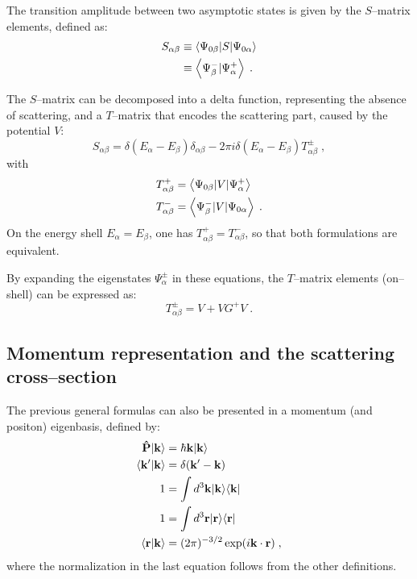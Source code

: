 The transition amplitude between two asymptotic states is given by the $S$--matrix elements, defined as:
\begin{align}
  S_{\alpha\beta} &\equiv \left\langle \Psi_{0\beta} \vert S \vert \Psi_{0\alpha} \right\rangle \nonumber\\
  & \equiv \left\langle \Psi_\beta^- \vert \Psi_\alpha^+ \right\rangle \; .
  \label{<++>}
\end{align}

The $S$--matrix can be decomposed into a delta function, representing the absence of scattering, and a $T$--matrix that encodes the scattering part, caused by the potential $V$:
\begin{equation*}
  S_{\alpha\beta} = \delta (E_\alpha - E_\beta)\delta_{\alpha\beta} - 2\pi i \delta (E_\alpha - E_\beta) T^\pm_{\alpha\beta} \; ,
\end{equation*}
with
\begin{align*}
  T^+_{\alpha\beta} & = \left\langle \Psi_{0\beta} \vert V \vert \Psi^+_\alpha \right\rangle \\
  T^-_{\alpha\beta} & = \left\langle \Psi^-_\beta \vert V \vert \Psi_{0\alpha} \right\rangle \; .
\end{align*}
On the energy shell $E_\alpha = E_\beta$, one has $T^+_{\alpha\beta}= T^-_{\alpha\beta}$, so that both formulations are equivalent.

By expanding the eigenstates $\Psi^\pm_\alpha$ in these equations, the $T$--matrix elements (on--shell) can be expressed as:
\begin{equation*}
  T^\pm_{\alpha\beta} = V + VG^+ V \; .
\end{equation*}


\subsection{Momentum representation and the scattering cross--section}
The previous general formulas can also be presented in a momentum (and positon) eigenbasis, defined by:
\begin{align*}
  \mathbf{\hat{P}}\vert \mathbf{k} \rangle & = \hbar \mathbf{k} \vert \mathbf{k} \rangle \\
  \left\langle \mathbf{k'} \vert \mathbf{k} \right\rangle & = \delta(\mathbf{k'}-\mathbf{k}) \\
  1 &= \int d^3\mathbf{k} \vert \mathbf{k} \rangle \langle \mathbf{k} \vert \\
  1 &= \int d^3\mathbf{r} \vert \mathbf{r} \rangle \langle \mathbf{r} \vert \\
  \left\langle \mathbf{r} \vert \mathbf{k} \right\rangle &= (2\pi)^{-3/2} \exp (i\mathbf{k}\cdot\mathbf{r}) \; ,
\end{align*}
where the normalization in the last equation follows from the other definitions.

